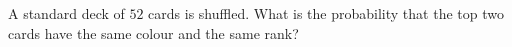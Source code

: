 A standard deck of $52$ cards is shuffled. What is the probability that the top two cards have the same colour and the same rank?
